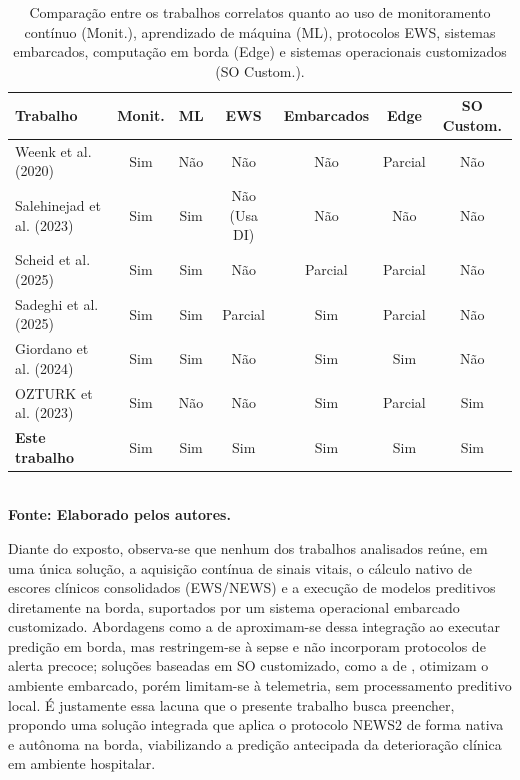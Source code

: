 \begin{table}[H]
\centering
\caption{Comparação entre os trabalhos correlatos quanto ao uso de monitoramento contínuo (Monit.), aprendizado de máquina (ML), protocolos EWS, sistemas embarcados, computação em borda (Edge) e sistemas operacionais customizados (SO Custom.).}
\label{tableCorrelatos}
\begin{tabular}{ |l|c|c|c|c|c|c| }
    \hline
    \textbf{Trabalho} & \textbf{Monit.} & \textbf{ML} & \textbf{EWS} & \textbf{Embarcados} & \textbf{Edge} & \textbf{SO Custom.} \\
    \hline
    Weenk et al. (2020)         & Sim & Não & Não       & Não & Parcial & Não \\
    Salehinejad et al. (2023)   & Sim & Sim & Não (Usa DI)       & Não & Não     & Não \\
    Scheid et al. (2025)        & Sim & Sim & Não       & Parcial & Parcial     & Não \\
    Sadeghi et al. (2025)       & Sim & Sim & Parcial   & Sim & Parcial & Não \\
    Giordano et al. (2024)      & Sim & Sim & Não       & Sim & Sim & Não \\
    OZTURK et al. (2023)        & Sim & Não & Não       & Sim & Parcial & Sim \\
    \textbf{Este trabalho}      & Sim & Sim & Sim       & Sim & Sim     & Sim \\
    \hline
\end{tabular}
{\footnotesize\\ \textbf{Fonte: Elaborado pelos autores.}}
\end{table}

Diante do exposto, observa-se que nenhum dos trabalhos analisados reúne, em uma única solução, a aquisição contínua de sinais vitais, o cálculo nativo de escores clínicos consolidados (EWS/NEWS) e a execução de modelos preditivos diretamente na borda, suportados por um sistema operacional embarcado customizado. Abordagens como a de \cite{giordano2024sepal} aproximam-se dessa integração ao executar predição em borda, mas restringem-se à sepse e não incorporam protocolos de alerta precoce; soluções baseadas em SO customizado, como a de \cite{ozturk2023}, otimizam o ambiente embarcado, porém limitam-se à telemetria, sem processamento preditivo local. É justamente essa lacuna que o presente trabalho busca preencher, propondo uma solução integrada que aplica o protocolo NEWS2 de forma nativa e autônoma na borda, viabilizando a predição antecipada da deterioração clínica em ambiente hospitalar.